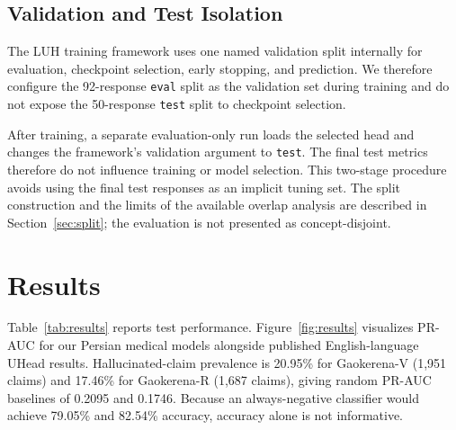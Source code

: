 \documentclass[conference,a4paper]{IEEEtran}
\begin{document}
\subsection{Validation and Test Isolation}

The LUH training framework uses one named validation split internally for evaluation, checkpoint selection, early stopping, and prediction. We therefore configure the 92-response \texttt{eval} split as the validation set during training and do not expose the 50-response \texttt{test} split to checkpoint selection.

After training, a separate evaluation-only run loads the selected head and changes the framework's validation argument to \texttt{test}. The final test metrics therefore do not influence training or model selection. This two-stage procedure avoids using the final test responses as an implicit tuning set. The split construction and the limits of the available overlap analysis are described in Section~\ref{sec:split}; the evaluation is not presented as concept-disjoint.

\section{Results}
\label{sec:results}

Table~\ref{tab:results} reports test performance. Figure~\ref{fig:results} visualizes PR-AUC for our Persian medical models alongside published English-language UHead results. Hallucinated-claim prevalence is 20.95\% for Gaokerena-V (1,951 claims) and 17.46\% for Gaokerena-R (1,687 claims), giving random PR-AUC baselines of 0.2095 and 0.1746. Because an always-negative classifier would achieve 79.05\% and 82.54\% accuracy, accuracy alone is not informative.
\end{document}
